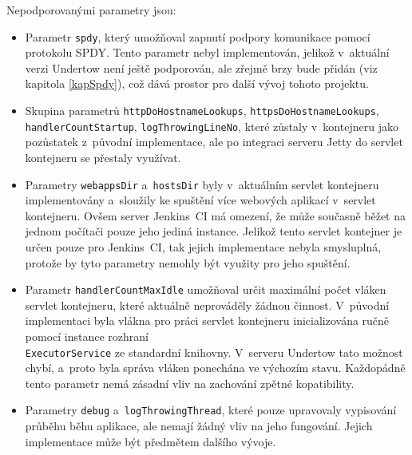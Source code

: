         \medskip
        \noindent Nepodporovanými parametry jsou:
        \begin{itemize}
            \item Parametr \texttt{spdy}, který umožňoval zapnutí podpory komunikace pomocí protokolu SPDY. Tento parametr
                nebyl implementován, jelikož v~aktuální verzi Undertow není ještě podporován, ale zřejmě
                brzy bude přidán (viz kapitola \ref{kapSpdy}), což dává prostor pro další vývoj tohoto projektu.

            \item Skupina parametrů \texttt{httpDoHostnameLookups}, \texttt{httpsDoHostnameLookups}, \\\texttt{handlerCountStartup},
                \texttt{logThrowingLineNo}, které zůstaly v~kontejneru jako pozůstatek z~původní implementace, ale po integraci
                serveru Jetty do servlet kontejneru se přestaly využívat.

            \item Parametry \texttt{webappsDir} a~\texttt{hostsDir} byly v~aktuálním servlet kontejneru implementovány
                a~sloužily ke spuštění více webových aplikací v~servlet kontejneru. Ovšem server Jenkins~CI má omezení,
                že může současně běžet na jednom počítači pouze jeho jediná instance. 
                Jelikož tento servlet kontejner je určen pouze pro Jenkins~CI, tak jejich implementace nebyla smysluplná,
                protože by tyto parametry nemohly být využity pro jeho spuštění.

            \item Parametr \texttt{handlerCountMaxIdle} umožňoval určit maximální počet vláken servlet kontejneru, 
                které aktuálně neprováděly žádnou činnost. V~původní implementaci byla vlákna pro práci servlet kontejneru
                inicializována ručně pomocí instance rozhraní \\\texttt{ExecutorService} ze standardní knihovny. 
                V~serveru Undertow tato možnost chybí, a~proto byla správa vláken ponechána ve výchozím stavu. Každopádně
                tento parametr nemá zásadní vliv na zachování zpětné kopatibility.

            \item Parametry \texttt{debug} a~\texttt{logThrowingThread}, které pouze upravovaly vypisování průběhu
                běhu aplikace, ale nemají žádný vliv na jeho fungování. Jejich implementace může být předmětem dalšího
                vývoje.
        \end{itemize}
        
